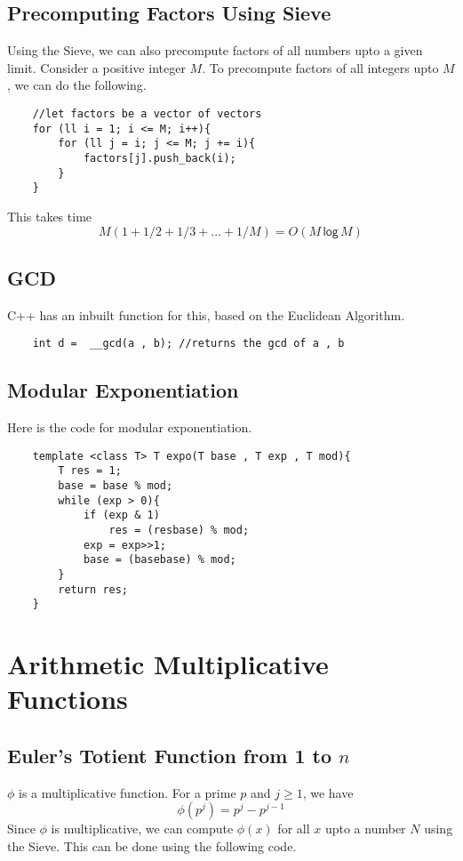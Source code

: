 \documentclass[12pt,a4paper]{amsart}
\numberwithin{equation}{section}
\theoremstyle{definition}
\begin{document}
\subsection{Precomputing Factors Using Sieve} Using the Sieve, we can also precompute factors of all numbers upto a given limit. Consider a positive integer $M$. To precompute factors of all integers upto $M$, we can do the following. 

\begin{lstlisting}
    //let factors be a vector of vectors
    for (ll i = 1; i <= M; i++){
        for (ll j = i; j <= M; j += i){
            factors[j].push_back(i);
        }
    }
\end{lstlisting}

This takes time 
$$M(1 + 1/2 + 1/3 + ... + 1/M) = O(M\mathsf{\,log\,}M)$$

\subsection{GCD} C++ has an inbuilt function for this, based on the Euclidean Algorithm.
\begin{lstlisting}
    int d =  __gcd(a , b); //returns the gcd of a , b
\end{lstlisting}

\subsection{Modular Exponentiation} Here is the code for modular exponentiation. 
\begin{lstlisting}
    template <class T> T expo(T base , T exp , T mod){
        T res = 1;
        base = base % mod;
        while (exp > 0){
            if (exp & 1)
                res = (resbase) % mod;
            exp = exp>>1;
            base = (basebase) % mod;
        }
        return res;
    }
\end{lstlisting}

\section{Arithmetic Multiplicative Functions}

\subsection{Euler's Totient Function from 1 to $n$} $\phi$ is a multiplicative function. For a prime $p$ and $j\ge 1$, we have 
$$\phi(p^j) = p^j - p^{j - 1}$$
Since $\phi$ is multiplicative, we can compute $\phi(x)$ for all $x$ upto a number $N$ using the Sieve. This can be done using the following code. 
\end{document}
